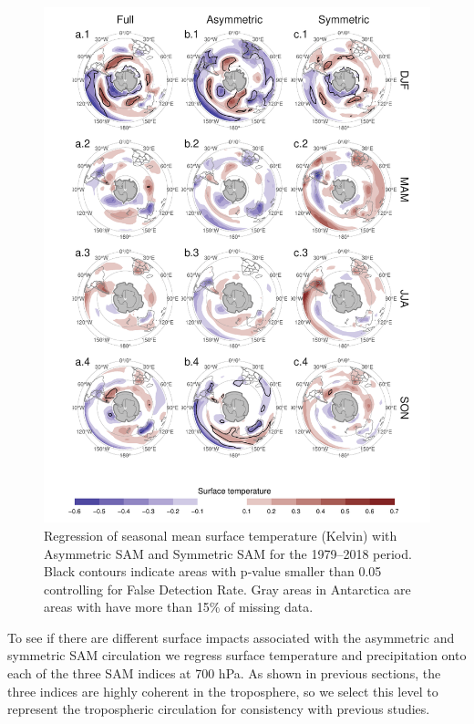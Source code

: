 \documentclass[]{ametsocV5}
\begin{document}
\begin{figure}
\includegraphics{regr-air-season-1} \caption[Regression of seasonal mean surface temperature (Kelvin) with Asymmetric SAM and Symmetric SAM for the 1979–2018 period]{Regression of seasonal mean surface temperature (Kelvin) with Asymmetric SAM and Symmetric SAM for the 1979–2018 period. Black contours indicate areas with p-value smaller than 0.05 controlling for False Detection Rate. Gray areas in Antarctica are areas with have more than 15\% of missing data.}\label{fig:regr-air-season}
\end{figure}

To see if there are different surface impacts associated with the
asymmetric and symmetric SAM circulation we regress surface temperature
and precipitation onto each of the three SAM indices at 700 hPa. As
shown in previous sections, the three indices are highly coherent in the
troposphere, so we select this level to represent the tropospheric
circulation for consistency with previous studies.
\end{document}
